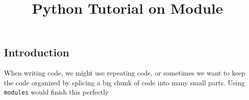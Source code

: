 \documentclass[chinese,12pt]{article}
\title{Python Tutorial on Module}
\begin{document}
\maketitle
\doublespacing
\begin{CJK*}{UTF8}{gbsn}
	\section{Introduction}
	\par When writing code, we might use repeating code, or sometimes we want to keep the code organized by splicing a big chunk of code into many small parts. Using \texttt{modules} would finish this perfectly

\end{CJK*}
\end{document}
